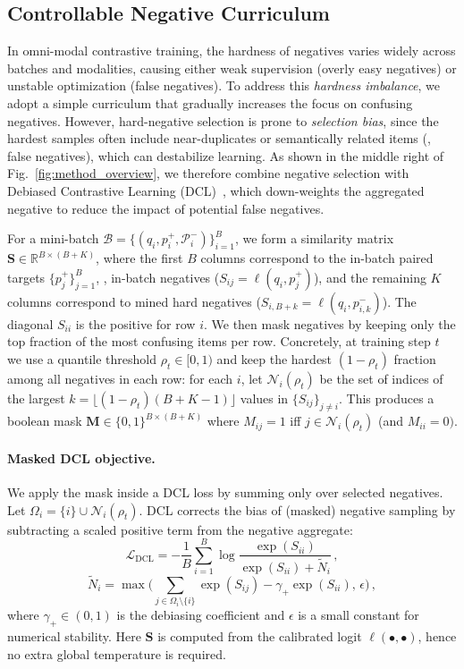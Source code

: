 \subsection{Controllable Negative Curriculum}
\label{subsec:method-hns}
In omni-modal contrastive training, the hardness of negatives varies widely across batches and modalities, causing either weak supervision (overly easy negatives) or unstable optimization (false negatives).
To address this \emph{hardness imbalance}, we adopt a simple curriculum that gradually increases the focus on confusing negatives.
However, hard-negative selection is prone to \emph{selection bias}, since the hardest samples often include near-duplicates or semantically related items (\ie, false negatives), which can destabilize learning.
As shown in the middle right of Fig.~\ref{fig:method_overview}, we therefore combine negative selection with Debiased Contrastive Learning (DCL)~\cite{dcl}, which down-weights the aggregated negative to reduce the impact of potential false negatives.


For a mini-batch $\mathcal{B}=\{(q_i,p_i^{+},\mathcal{P}_i^{-})\}_{i=1}^{B}$, we form a similarity matrix
$\mathbf{S}\in\mathbb{R}^{B\times(B+K)}$, where the first $B$ columns correspond to the in-batch paired targets $\{p_j^{+}\}_{j=1}^{B}$, \ie, in-batch negatives
($S_{ij}=\ell(q_i,p_j^{+})$), and the remaining $K$ columns correspond to mined hard negatives
($S_{i,B+k}=\ell(q_i,p_{i,k}^{-})$). 
The diagonal $S_{ii}$ is the positive for row $i$.
We then mask negatives by keeping only the top fraction of the most confusing items per row.
Concretely, at training step $t$ we use a quantile threshold $\rho_t\in[0,1)$ and keep the hardest
$(1-\rho_t)$ fraction among all negatives in each row: for each $i$, let $\mathcal{N}_i(\rho_t)$ be the
set of indices of the largest $k=\lfloor(1-\rho_t)(B+K-1)\rfloor$ values in $\{S_{ij}\}_{j\neq i}$.
This produces a boolean mask $\mathbf{M}\in\{0,1\}^{B\times(B+K)}$ where $M_{ij}=1$ iff $j\in\mathcal{N}_i(\rho_t)$
(and $M_{ii}=0)$.

\paragraph{Masked DCL objective.}
We apply the mask inside a DCL loss by summing only over selected negatives.
Let $\Omega_i=\{i\}\cup \mathcal{N}_i(\rho_t)$.
DCL corrects the bias of (masked) negative sampling by subtracting a scaled positive term from the negative aggregate:
\begin{equation}
\mathcal{L}_{\mathrm{DCL}}
=-\frac{1}{B}\sum_{i=1}^{B}\log
\frac{\exp(S_{ii})}{\exp(S_{ii})+\widetilde{N}_i}\,,
\label{eq:dcl}
\end{equation}
$$
\widetilde{N}_i=\max\!\Big(\sum_{j\in\Omega_i\setminus\{i\}} \exp(S_{ij})-\gamma_{+}\exp(S_{ii}),\,\epsilon\Big)\,,
$$
where $\gamma_{+}\in(0,1)$ is the debiasing coefficient and $\epsilon$ is a small constant for numerical stability.
Here $\mathbf{S}$ is computed from the calibrated logit $\ell(\bullet,\bullet)$, hence no extra global temperature is required.


